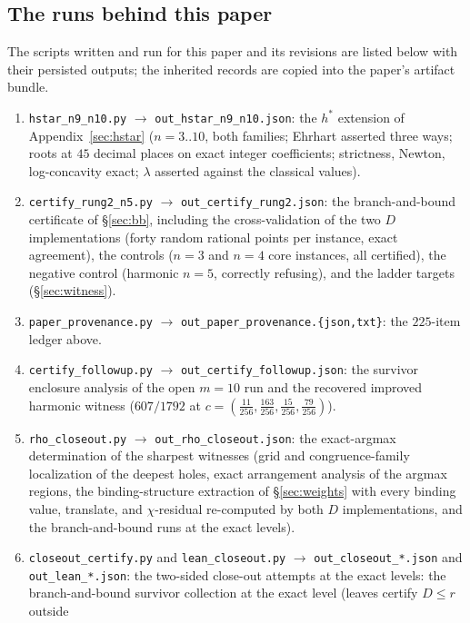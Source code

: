 \documentclass[11pt,a4paper]{article}
\numberwithin{equation}{section}
\theoremstyle{plain}
\theoremstyle{definition}
\theoremstyle{remark}
\begin{document}
\subsection{The runs behind this paper}

The scripts written and run for this paper and its revisions are listed
below with their persisted outputs; the inherited records are copied
into the paper's artifact bundle.

\begin{enumerate}[leftmargin=1.6em,itemsep=2pt]
\item \texttt{hstar\_n9\_n10.py} $\to$ \texttt{out\_hstar\_n9\_n10.json}:
the $h^*$ extension of Appendix~\ref{sec:hstar} ($n=3..10$, both
families; Ehrhart asserted three ways; roots at $45$ decimal places on
exact integer coefficients; strictness, Newton, log-concavity exact;
$\lambda$ asserted against the classical values).
\item \texttt{certify\_rung2\_n5.py} $\to$
\texttt{out\_certify\_rung2.json}: the branch-and-bound certificate of
\S\ref{sec:bb}, including the cross-validation of the two $D$
implementations (forty random rational points per instance, exact
agreement), the controls ($n=3$ and $n=4$ core instances, all
certified), the negative control (harmonic $n=5$, correctly refusing),
and the ladder targets (\S\ref{sec:witness}).
\item \texttt{paper\_provenance.py} $\to$
\texttt{out\_paper\_provenance.\{json,txt\}}: the $225$-item ledger
above.
\item \texttt{certify\_followup.py} $\to$
\texttt{out\_certify\_followup.json}: the survivor enclosure analysis
of the open $m=10$ run and the recovered improved harmonic witness
($607/1792$ at $c=(\tfrac{11}{256},\tfrac{163}{256},
\tfrac{15}{256},\tfrac{79}{256})$).
\item \texttt{rho\_closeout.py} $\to$ \texttt{out\_rho\_closeout.json}:
the exact-argmax determination of the sharpest witnesses (grid and
congruence-family localization of the deepest holes, exact arrangement
analysis of the argmax regions, the binding-structure extraction of
\S\ref{sec:weights} with every binding value, translate, and
$\chi$-residual re-computed by both $D$ implementations, and the
branch-and-bound runs at the exact levels).
\item {\sloppy\texttt{closeout\_certify.py} and \texttt{lean\_closeout.py} $\to$
\texttt{out\_closeout\_*.json} and \texttt{out\_lean\_*.json}: the
two-sided close-out attempts at the exact levels: the branch-and-bound
survivor collection at the exact level (leaves certify $D\le r$ outside
}
\end{enumerate}
\end{document}
